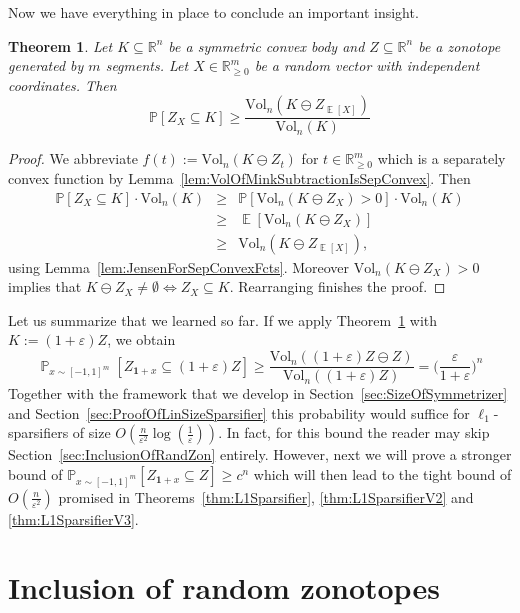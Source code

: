 \documentclass[12pt,english]{article}
\theoremstyle{theorem}
\newtheorem{theorem}{Theorem}
\theoremstyle{remark}
\providecommand{\setR}{\mathbb{R}}
\newcommand{\E}{\mathop{\mathbb{E}}}
\newcommand{\Vol}{\mathrm{Vol}}
\renewcommand{\Pr}{\mathop{\mathbb{P}}}
\begin{document}
Now we have everything in place to conclude an important insight. %
\begin{theorem}\label{thm:RandomZonotopeInclusion}
  Let $K \subseteq \setR^n$ be a symmetric convex body and $Z \subseteq \setR^n$ be a zonotope generated by $m$ segments.
  Let $X \in \setR_{\ge 0}^m$ be a random vector with independent coordinates. Then
  \[
    \mathbb{P}[Z_X \subseteq K] \geq \frac{\Vol_n(K \ominus Z_{\E[X]})}{\Vol_n(K)}
  \]
\end{theorem}
\begin{proof}
  We abbreviate $f(t) := \Vol_n(K \ominus Z_t)$ for $t \in \setR_{\geq 0}^m$ which is a separately convex function by Lemma~\ref{lem:VolOfMinkSubtractionIsSepConvex}. Then
  \begin{eqnarray*}
\mathbb{P}[Z_X \subseteq K] \cdot \Vol_n(K) &\geq& \mathbb{P}[\Vol_n(K \ominus Z_X)>0] \cdot \Vol_n(K)  \\ &\geq& \E[\Vol_n(K \ominus Z_X)] \\ &\geq& \Vol_n(K \ominus Z_{\E[X]}),
  \end{eqnarray*}
  using Lemma~\ref{lem:JensenForSepConvexFcts}. Moreover
 $\Vol_n(K \ominus Z_X)>0$ implies that $K \ominus Z_X \neq \emptyset \iff Z_X \subseteq K$. Rearranging  finishes the proof.
\end{proof}
Let us summarize that we learned so far. If we apply Theorem~\ref{thm:RandomZonotopeInclusion} with $K := (1+\varepsilon)Z$, we obtain
\[
  \Pr_{x \sim [-1,1]^m}[Z_{\bm{1}+x} \subseteq (1+\varepsilon) Z] \geq \frac{\Vol_n((1+\varepsilon)Z \ominus Z)}{\Vol_n((1+\varepsilon) Z)} = \Big(\frac{\varepsilon}{1+\varepsilon}\Big)^n
\]
Together with the framework that we develop in Section~\ref{sec:SizeOfSymmetrizer} and Section~\ref{sec:ProofOfLinSizeSparsifier} this probability would suffice for $\ell_1$-sparsifiers of size $O(\frac{n}{\varepsilon^2} \log(\frac{1}{\varepsilon}))$. In fact, for this bound the reader may skip Section~\ref{sec:InclusionOfRandZon} entirely.
However, next we will prove a stronger bound of $\mathbb{P}_{x \sim [-1,1]^m}[Z_{\bm{1}+x} \subseteq Z] \geq c^n$ which will then lead to the tight bound of $O(\frac{n}{\varepsilon^2})$ promised in Theorems~\ref{thm:L1Sparsifier}, \ref{thm:L1SparsifierV2} and \ref{thm:L1SparsifierV3}.


\section{Inclusion of random zonotopes\label{sec:InclusionOfRandZon}}
\end{document}
